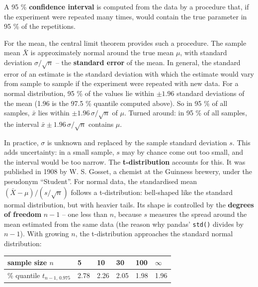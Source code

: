 \documentclass[
  letterpaper,
  DIV=11,
  numbers=noendperiod]{scrreprt}
\begin{document}
\begin{tcolorbox}[enhanced jigsaw, left=2mm, title=\textcolor{quarto-callout-note-color}{\faInfo}\hspace{0.5em}{Definition: Confidence interval}, opacityback=0, breakable, rightrule=.15mm, arc=.35mm, toptitle=1mm, colbacktitle=quarto-callout-note-color!10!white, opacitybacktitle=0.6, coltitle=black, colframe=quarto-callout-note-color-frame, bottomrule=.15mm, leftrule=.75mm, bottomtitle=1mm, titlerule=0mm, toprule=.15mm, colback=white]

A 95 \% \textbf{confidence interval} is computed from the data by a
procedure that, if the experiment were repeated many times, would
contain the true parameter in 95 \% of the repetitions.

\end{tcolorbox}

For the mean, the central limit theorem provides such a procedure. The
sample mean \(\bar X\) is approximately normal around the true mean
\(\mu\), with standard deviation \(\sigma/\sqrt n\) -- the
\textbf{standard error} of the mean. In general, the standard error of
an estimate is the standard deviation with which the estimate would vary
from sample to sample if the experiment were repeated with new data. For
a normal distribution, 95 \% of the values lie within \(\pm 1.96\)
standard deviations of the mean (1.96 is the 97.5 \% quantile computed
above). So in 95 \% of all samples, \(\bar x\) lies within
\(\pm 1.96\,\sigma/\sqrt n\) of \(\mu\). Turned around: in 95 \% of all
samples, the interval \(\bar x \pm 1.96\,\sigma/\sqrt n\) contains
\(\mu\).

In practice, \(\sigma\) is unknown and replaced by the sample standard
deviation \(s\). This adds uncertainty: in a small sample, \(s\) may by
chance come out too small, and the interval would be too narrow. The
\textbf{t-distribution} accounts for this. It was published in 1908 by
W. S. Gosset, a chemist at the Guinness brewery, under the pseudonym
``Student''. For normal data, the standardised mean
\((\bar X - \mu)/(s/\sqrt n)\) follows a t-distribution: bell-shaped
like the standard normal distribution, but with heavier tails. Its shape
is controlled by the \textbf{degrees of freedom} \(n - 1\) -- one less
than \(n\), because \(s\) measures the spread around the mean estimated
from the same data (the reason why pandas' \texttt{std()} divides by
\(n - 1\)). With growing \(n\), the t-distribution approaches the
standard normal distribution:

\begin{longtable}[]{@{}llllll@{}}
\toprule\noalign{}
sample size \(n\) & 5 & 10 & 30 & 100 & \(\infty\) \\
\midrule\noalign{}
\endhead
\bottomrule\noalign{}
\endlastfoot
97.5 \% quantile \(t_{n-1,\,0.975}\) & 2.78 & 2.26 & 2.05 & 1.98 &
1.96 \\
\end{longtable}
\end{document}
